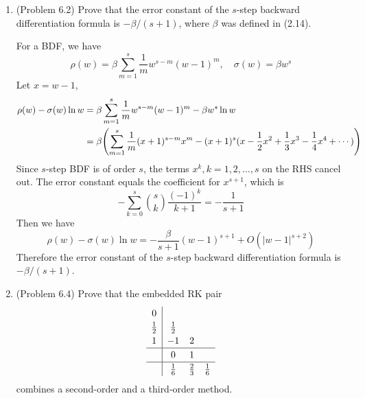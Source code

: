 \documentclass[10pt]{report}
\newcommand{\abs}[1] {\left| #1 \right|}
\DeclarePairedDelimiter\autoparen{(}{)}
\newcommand{\pa}[1]{\autoparen*{#1}}
\begin{document}
\begin{enumerate}
	\item 
	(Problem 6.2) Prove that the error constant of the $s$-step backward differentiation formula is $-\beta/(s + 1)$, where $\beta$ was defined in (2.14).
	
	For a BDF, we have
	\[
	\rho(w) = \beta \sum_{m=1}^{s} \frac{1}{m} w^{s-m} (w-1)^m,\quad \sigma(w) = \beta w^s
	\]
	Let $x = w - 1$,
	\begin{align*}
		\rho(w) - \sigma(w) \ln{w}
		&= \beta \sum_{m=1}^{s} \frac{1}{m} w^{s-m} (w-1)^m - \beta w^s \ln{w}\\
		&= \beta \pa{\sum_{m=1}^{s} \frac{1}{m} (x+1)^{s-m} x^m - (x+1)^s (x-\frac{1}{2}x^2 + \frac{1}{3}x^3 - \frac{1}{4}x^4 + \cdots)}
	\end{align*}
	Since $s$-step BDF is of order $s$, the terms $x^k, k=1,2,\dots,s$ on the RHS cancel out. The error constant equals the coefficient for $x^{s+1}$, which is
	\[
	-\sum_{k=0}^{s}\binom{s}{k} \frac{(-1)^k}{k+1} = -\frac{1}{s+1}
	\]
	Then we have
	\[
	\rho(w) - \sigma(w) \ln{w} = -\frac{\beta}{s+1}(w-1)^{s+1} + O(\abs{w-1}^{s+2})
	\]
	Therefore the error constant of the $s$-step backward differentiation formula is $-\beta/(s + 1)$.
	
	\item 
	(Problem 6.4) Prove that the embedded RK pair
	\[
	\renewcommand{\arraystretch}{1.2}
	\begin{array}{c|ccc}
	0 &&&\\
	\frac{1}{2} & \frac{1}{2} &&\\
	1 & -1 & 2 &\\ \hline
	& 0 & 1 &\\ \hline
	& \frac{1}{6} & \frac{2}{3} & \frac{1}{6}
	\end{array}
	\]
	combines a second-order and a third-order method.
	

\end{enumerate}
\end{document}

